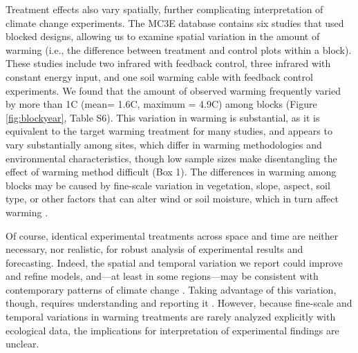 \documentclass{article}
\begin{document}
\par Treatment effects also vary spatially, further complicating interpretation of climate change experiments. The MC3E database contains six studies that used blocked designs, allowing us to examine spatial variation in the amount of warming (i.e., the difference between treatment and control plots within a block). These studies include two infrared with feedback control, three infrared with constant energy input,  and one soil warming cable with feedback control experiments. We found that the amount of observed warming frequently varied by more than 1\degree C (mean= 1.6\degree C, maximum = 4.9\degree C) among blocks (Figure \ref{fig:blockyear}, Table S6). This variation in warming is substantial, as it is equivalent to the target warming treatment for many studies, and appears to vary substantially among sites, which differ in warming methodologies and environmental characteristics, though low sample sizes make disentangling the effect of warming method difficult (Box 1). The differences in warming among blocks may be caused by fine-scale variation in vegetation, slope, aspect, soil type, or other factors that can alter wind or soil moisture, which in turn affect warming \citep{peterjohn1993,kimball2005,kimball2008,hoeppner2012,rollinson2015}. %


\par Of course, identical experimental treatments across space and time are neither necessary, nor realistic, for robust analysis of experimental results and forecasting. %
Indeed, the spatial and temporal variation we report could improve and refine models, and---at least in some regions---may be consistent with contemporary patterns of climate change \citep{ipcc2013}. Taking advantage of this variation, though, requires understanding and reporting it \citep[e.g.,][]{milcu2016}. However, because fine-scale and temporal variations in warming treatments are rarely analyzed explicitly with ecological data, the implications for interpretation of experimental findings are unclear.
\end{document}
